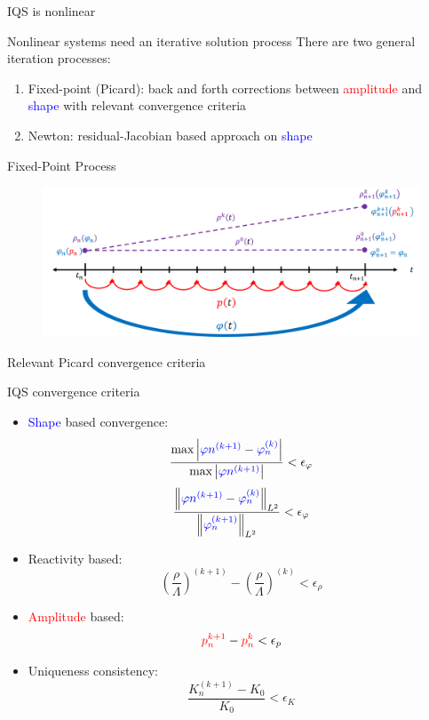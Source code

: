 \documentclass[8pt,xcolor=dvipnames]{beamer}
\newcommand{\be}{\begin{equation*}}
\newcommand{\ee}{\end{equation*}}
\newcommand{\norm}[1]{\left\lVert#1\right\rVert_{L^2}}
\newcommand{\tcr}[1]{\textcolor{red}{#1}}
\newcommand{\tcb}[1]{\textcolor{blue}{#1}}
\begin{document}
\begin{frame}{IQS is nonlinear}

\begin{block}{Nonlinear systems need an iterative solution process}
There are two general iteration processes: 
\begin{enumerate}
\item Fixed-point (Picard): back and forth corrections between \tcr{amplitude} and \tcb{shape} with relevant convergence criteria
\item Newton: residual-Jacobian based approach on \tcb{shape}
\end{enumerate}
\end{block}

\begin{block}{Fixed-Point Process}
\begin{figure}
\includegraphics[width=\linewidth]{figures/iqs_iter_proc.png}
\end{figure}
\end{block}

\end{frame}

\begin{frame}{Relevant Picard convergence criteria}

\begin{block}{IQS convergence criteria}
\begin{itemize}
\item \tcb{Shape} based convergence:
\be
\frac{\text{max}\left|\tcb{\varphi{n}^{(k+1)}} - \tcb{\varphi_{n}^{(k)}}\right|}{\text{max}\left|\tcb{\varphi{n}^{(k+1)}}\right|} < \epsilon_{\varphi}
\ee 
\be
\frac{\norm{\tcb{\varphi{n}^{(k+1)}} - \tcb{\varphi_{n}^{(k)}}}}{\norm{\tcb{\varphi_{n}^{(k+1)}}}} < \epsilon_{\varphi}
\ee 

\item Reactivity based:
\be
\left(\frac{\rho}{\Lambda}\right)^{(k+1)} - \left(\frac{\rho}{\Lambda}\right)^{(k)} < \epsilon_{\rho}
\ee

\item \tcr{Amplitude} based:
\be 
\tcr{p_n^{k+1}} - \tcr{p_n^{k}} < \epsilon_p
\ee

\item Uniqueness consistency:
\be 
\frac{K_n^{(k+1)} - K_0}{K_0} < \epsilon_K
\ee
\end{itemize}
\end{block}

\end{frame}
\end{document}
